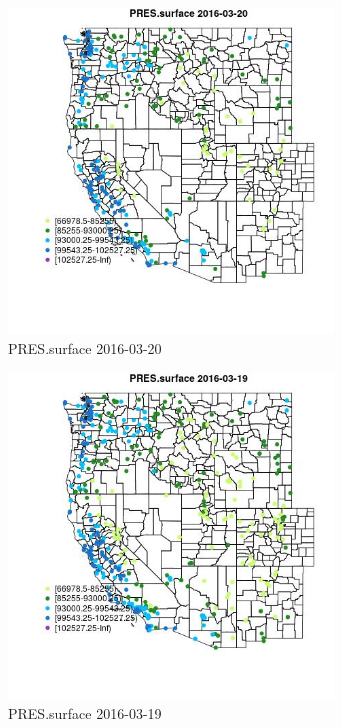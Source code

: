 \begin{figure} 
\centering  
\includegraphics[width=0.77\textwidth]{Code_Outputs/Report_ML_input_PM25_Step4_part_e_de_duplicated_aveswNAs_MapObsPRESsurface2016-03-20.jpg} 
\caption{\label{fig:Report_ML_input_PM25_Step4_part_e_de_duplicated_aveswNAsMapObsPRESsurface2016-03-20}PRES.surface 2016-03-20} 
\end{figure} 
 

\clearpage 

\begin{figure} 
\centering  
\includegraphics[width=0.77\textwidth]{Code_Outputs/Report_ML_input_PM25_Step4_part_e_de_duplicated_aveswNAs_MapObsPRESsurface2016-03-19.jpg} 
\caption{\label{fig:Report_ML_input_PM25_Step4_part_e_de_duplicated_aveswNAsMapObsPRESsurface2016-03-19}PRES.surface 2016-03-19} 
\end{figure} 
 

